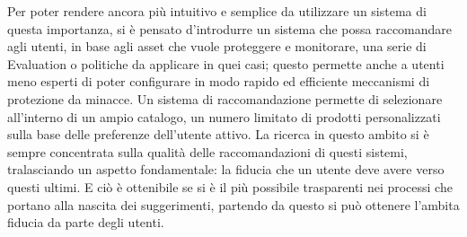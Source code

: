 \hfill\break
Per poter rendere ancora più intuitivo e semplice da utilizzare un sistema di questa importanza, si è pensato d'introdurre un sistema
che possa raccomandare agli utenti, in base agli asset che vuole proteggere e monitorare, una serie di Evaluation o politiche da
applicare in quei casi; questo permette anche a utenti meno esperti di poter configurare in modo rapido ed efficiente meccanismi di
protezione da minacce. Un sistema di raccomandazione permette di selezionare all’interno  di un ampio catalogo, un numero limitato di prodotti 
personalizzati sulla base delle preferenze dell’utente attivo. La ricerca in questo ambito si è sempre concentrata sulla qualità delle 
raccomandazioni di questi sistemi, tralasciando un aspetto fondamentale: la fiducia che un utente deve avere verso questi ultimi.
E ciò è ottenibile se si è il più possibile trasparenti nei processi che portano alla nascita dei suggerimenti, partendo da questo 
si può ottenere l'ambita fiducia da parte degli utenti.

